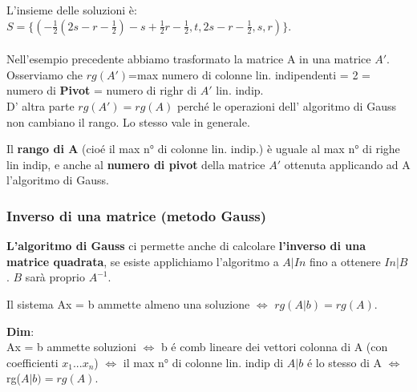 \documentclass[12pt]{article}
\begin{document}
L'insieme delle soluzioni è: $S = \{(-\frac{1}{2}(2s-r-\frac{1}{2})-s+\frac{1}{2}r - \frac{1}{2}, t, 2s-r-\frac{1}{2},s,r)\}$.\\\\
Nell'esempio precedente abbiamo trasformato la matrice A in una matrice $A'$. Osserviamo che $rg(A')$=max numero di colonne lin. indipendenti = 2 = numero di \textbf{Pivot} = numero di righr di $A'$ lin. indip.\\
D' altra parte $rg(A') = rg(A)$ perché le operazioni dell' algoritmo di Gauss non cambiano il rango. Lo stesso vale in generale.
\begin{theorem}
    Il \textbf{rango di A} (cioé il max n° di colonne lin. indip.) è uguale al max n° di righe lin indip, e anche al \textbf{numero di pivot} della matrice $A'$ ottenuta applicando ad A l'algoritmo di Gauss.
\end{theorem}
 
\subsubsection{Inverso di una matrice (metodo Gauss)}
\textbf{L'algoritmo di Gauss} ci permette anche di calcolare \textbf{l'inverso di una matrice quadrata}, se esiste applichiamo l'algoritmo a $A|In$ fino a ottenere $In|B$. $B$ sarà proprio $A^{-1}$.

\begin{theorem}
    Il sistema Ax = b ammette almeno una soluzione $\iff$ $rg(A|b) = rg(A)$.
\end{theorem}
\textbf{Dim}:\\
Ax = b ammette soluzioni $\iff$ b é comb lineare dei vettori colonna di A (con coefficienti $x_1...x_n$) $\iff$ il max n° di colonne lin. indip di $A|b$ é lo stesso di A $\iff$ rg($A|b) = rg(A)$.
\end{document}
